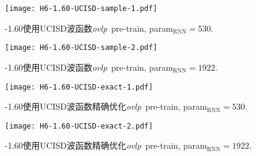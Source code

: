 \begin{figure}[htp]
    \centering
    \texttt{[image: H6-1.60-UCISD-sample-1.pdf]}
    \caption{-1.60使用UCISD波函数\textit{ovlp}\ pre-train,
            param$_{\mathrm{RNN}}=530$.}
    \label{H6-1.60-UCISD-sample-1}
\end{figure}

\begin{figure}[htp]
    \centering
    \texttt{[image: H6-1.60-UCISD-sample-2.pdf]}
    \caption{-1.60使用UCISD波函数\textit{ovlp}\ pre-train,
            param$_{\mathrm{RNN}}=1922$.
            }
    \label{H6-1.60-UCISD-sample-2}
\end{figure}

\begin{figure}[htp]
    \centering
    \texttt{[image: H6-1.60-UCISD-exact-1.pdf]}
    \caption{-1.60使用UCISD波函数精确优化\textit{ovlp}\ pre-train,
            param$_{\mathrm{RNN}}=530$.}
    \label{H6-1.60-UCISD-exact-1}
\end{figure}

\begin{figure}[htp]
    \centering
    \texttt{[image: H6-1.60-UCISD-exact-2.pdf]}
    \caption{-1.60使用UCISD波函数精确优化\textit{ovlp}\ pre-train,
            param$_{\mathrm{RNN}}=1922$.
            }
    \label{H6-1.60-UCISD-exact-2}
\end{figure}